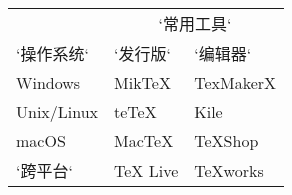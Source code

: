 \begin{table}[htbp]
\centering
\begin{tabular}{lll}
  \toprule
  & \multicolumn{2}{c}{`常用工具`} \\
  \cmidrule{2-3}
  `操作系统`    & `发行版`     & `编辑器` \\
  \midrule
  Windows    & MikTeX    & TexMakerX \\
  Unix/Linux & teTeX     & Kile \\
  macOS      & MacTeX    & TeXShop \\
  `跨平台`      & TeX Live  & TeXworks \\
  \bottomrule
\end{tabular}
\end{table}
